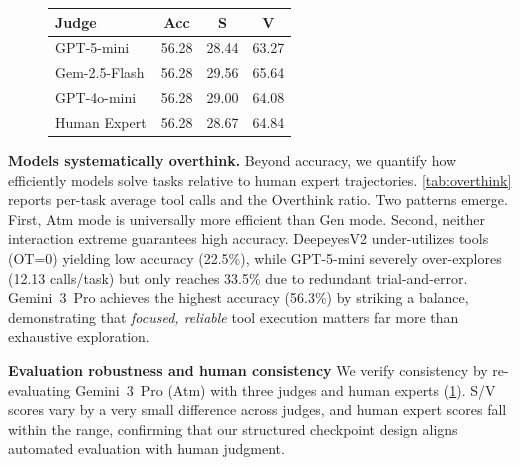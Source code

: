 \documentclass[runningheads]{llncs}
\theoremstyle{plain}
\theoremstyle{definition}
\theoremstyle{remark}
\begin{document}
\begin{figure}[t]
\begin{minipage}[t]{0.43\textwidth}
    \setlength{\aboverulesep}{0pt}
    \setlength{\belowrulesep}{0pt}
    \begin{tabular}{l ccc}
        \toprule
        \rowcolor{CadetBlue!20}
        \textbf{Judge}
        & \textbf{Acc} & \textbf{S} & \textbf{V} \\
        \midrule
        GPT-5-mini       & 56.28 & 28.44 & 63.27 \\
        Gem-2.5-Flash    & 56.28 & 29.56 & 65.64 \\
        GPT-4o-mini      & 56.28 & 29.00 & 64.08 \\
        \midrule
        \rowcolor{customblue!20}
        Human Expert     & 56.28 & 28.67 & 64.84 \\
        \bottomrule
    \end{tabular}
    \label{tab:judge_robust}
\end{minipage}
\vspace{-4mm}
\end{figure}

\vspace{1mm}
\noindent\textbf{Models systematically overthink.} Beyond accuracy, we quantify how efficiently models solve tasks relative to human expert trajectories. \cref{tab:overthink} reports per-task average tool calls and the
Overthink ratio. Two patterns emerge. First, Atm mode is universally more efficient than Gen mode. Second, neither interaction extreme guarantees high accuracy. DeepeyesV2 under-utilizes tools (OT=0) yielding low accuracy (22.5\%), while GPT-5-mini severely over-explores (12.13 calls/task) but only reaches 33.5\% due to redundant trial-and-error. Gemini~3~Pro achieves the highest accuracy (56.3\%) by striking a balance, demonstrating that \emph{focused, reliable} tool execution matters far more than exhaustive exploration.

\vspace{1mm}
\noindent\textbf{Evaluation robustness and human consistency} We verify consistency by re-evaluating Gemini~3~Pro (Atm) with three judges and human experts (\cref{tab:judge_robust}). S/V scores vary by a very small difference across judges, and human expert scores fall within the range, confirming that our structured checkpoint design aligns automated evaluation with human judgment.
\end{document}
